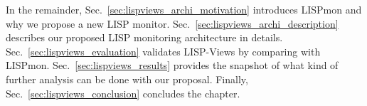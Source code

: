 In the remainder, Sec.~\ref{sec:lispviews_archi_motivation} introduces LISPmon and why we propose a new LISP monitor. Sec.~\ref{sec:lispviews_archi_description} describes our proposed LISP monitoring architecture in details. Sec.~\ref{sec:lispviews_evaluation} validates LISP-Views by comparing with LISPmon. Sec.~\ref{sec:lispviews_results} provides the snapshot of what kind of further analysis can be done with our proposal. Finally, Sec.~\ref{sec:lispviews_conclusion} concludes the chapter. 


%




